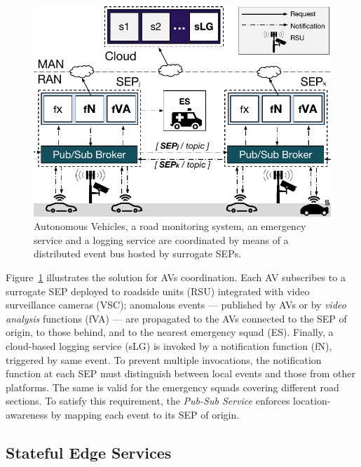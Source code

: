 \begin{figure}[bp]
	\centering
	\includegraphics[width=1\linewidth]{Figs/Edge_Coordination_AVs_wide.pdf}
	\caption{Autonomous Vehicles, a road monitoring system, an emergency service and a logging service are coordinated by means of a distributed event bus hosted by surrogate SEPs.}
	\label{fig:Edge_Coordination_AVs}
\end{figure}

Figure~\ref{fig:Edge_Coordination_AVs} illustrates the solution for AVs coordination. Each AV subscribes to a surrogate SEP deployed to roadside units (RSU) integrated with video surveillance cameras (VSC); anomalous events --- published by AVs or by \textit{video analysis} functions (fVA) --- are propagated to the AVs connected to the SEP of origin, to those behind, and to the nearest emergency squad (ES). Finally, a cloud-based logging service (sLG) is invoked by a notification function (fN), triggered by same event. To prevent multiple invocations, the notification function at each SEP must distinguish between local events and those from other platforms. The same is valid for the emergency squads covering different road sections. To satisfy this requirement, the \textit{Pub-Sub Service} enforces location-awareness by mapping each event to its SEP of origin.

\subsection{Stateful Edge Services}

